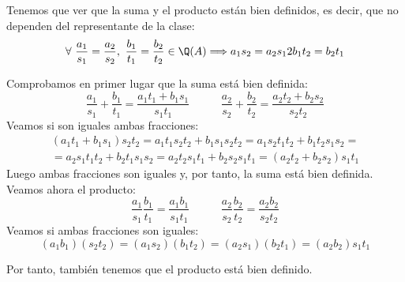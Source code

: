 Tenemos que ver que la suma y el producto están bien definidos, es decir, que no dependen del representante de la clase:
$$\forall ~\dfrac{a_1}{s_1} = \dfrac{a_2}{s_2}, ~\dfrac{b_1}{t_1} = \dfrac{b_2}{t_2} \in \Q(A) \Longrightarrow a_1s_2 = a_2 s_1
    \y b_1 t_2 = b_2 t_1$$

Comprobamos en primer lugar que la suma está bien definida:
$$\dfrac{a_1}{s_1} + \dfrac{b_1}{t_1} = \dfrac{a_1t_1 + b_1s_1}{s_1t_1}\hspace{1cm}~~
    \dfrac{a_2}{s_2} + \dfrac{b_2}{t_2} = \dfrac{a_2t_2 + b_2s_2}{s_2t_2}$$
Veamos si son iguales ambas fracciones:
\begin{multline*}
    (a_1t_1 + b_1s_1)s_2t_2 = a_1t_1s_2t_2 + b_1s_1s_2t_2 = a_1s_2t_1t_2 + b_1t_2s_1s_2 = \\
    =a_2s_1t_1t_2 + b_2t_1s_1s_2 = a_2t_2s_1t_1 + b_2s_2s_1t_1 = (a_2t_2 + b_2s_2)s_1t_1
\end{multline*}
Luego ambas fracciones son iguales y, por tanto, la suma está bien definida. Veamos ahora el producto:
$$\dfrac{a_1}{s_1}\dfrac{b_1}{t_1} = \dfrac{a_1b_1}{s_1t_1}\hspace{1cm}~~
    \dfrac{a_2}{s_2}\dfrac{b_2}{t_2} = \dfrac{a_2b_2}{s_2t_2}$$
Veamos si ambas fracciones son iguales:
$$(a_1b_1)(s_2t_2) = (a_1s_2)(b_1t_2) = (a_2s_1)(b_2t_1) = (a_2b_2)s_1t_1$$

Por tanto, también tenemos que el producto está bien definido.

